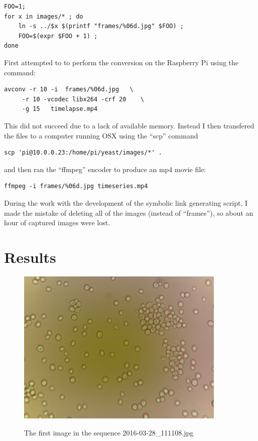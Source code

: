 \documentclass[12pt, a4paper]{article}
\begin{document}
\begin{lstlisting}[frame=single]
FOO=1; 
for x in images/* ; do 
    ln -s ../$x $(printf "frames/%06d.jpg" $FOO) ;
    FOO=$(expr $FOO + 1) ; 
done
\end{lstlisting}

First attempted to to perform the conversion on the Raspberry Pi using
the command:

\begin{lstlisting}[frame=single]
avconv -r 10 -i  frames/%06d.jpg   \
     -r 10 -vcodec libx264 -crf 20    \
     -g 15   timelapse.mp4 
\end{lstlisting}


This did not succeed due to a lack of available memory.  Instead I
then transfered the files to a computer running OSX using the ``scp''
command 

\begin{lstlisting}
scp 'pi@10.0.0.23:/home/pi/yeast/images/*' . 
\end{lstlisting}

and then ran the ``ffmpeg'' encoder to produce an mp4 movie file:

\begin{lstlisting}
ffmpeg -i frames/%06d.jpg timeseries.mp4 
\end{lstlisting}

During the work with the development of the symbolic link generating
script, I made the mistake of deleting all of the images (instead of
``frames''), so about an hour of captured images were lost.


\section{Results}

\begin{figure}[th]
\begin{center}
\includegraphics[width=10cm]{images/2016-03-28_111108.jpg}
\label{firstimage}
\caption{The first image in the sequence 2016-03-28\_111108.jpg}
\end{center}
\end{figure}
\end{document}
